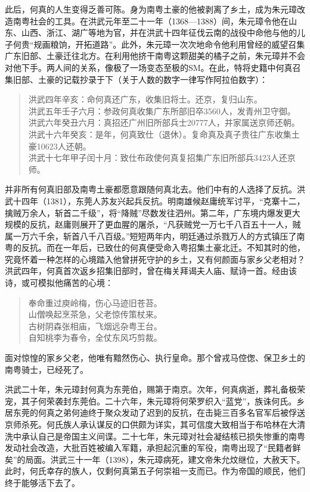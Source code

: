 此后，何真的人生变得乏善可陈。身为南粤土豪的他被剥离了乡土，成为朱元璋改造南粤社会的工具。在洪武元年至二十一年（1368—1388）间，朱元璋令他在山东、山西、浙江、湖广等地为官，并在洪武十四年征伐云南的战役中命他与他的儿子何贵“规画粮饷，开拓道路”。此外，朱元璋一次次地命令他利用曾经的威望召集广东旧部、土豪迁往北方。在利用他挤干南粤这颗甜美的橘子之前，朱元璋并不会对他下手。两人间的关系，像极了一场变态至极的SM。在此，特将史籍中何真召集旧部、土豪的记载抄录于下（关于人数的数字一律写作阿拉伯数字）：

\begin{quote}
洪武四年辛亥：命何真还广东，收集旧将士。还京，复归山东。\\
洪武五年壬子六月：参政何真收集广东所部旧卒3560人，发青州卫守御。\\
洪武六年癸丑六月：真招还广州旧所部兵士20777人，并家属送京师还朝。\\
洪武十六年癸亥：是年，何真致仕（退休）。复命真及真子贵往广东收集土豪10623人还朝。\\
洪武十七年甲子闰十月：致仕布政使何真复招集广东旧所部兵3423人还京师。
\end{quote}

并非所有何真旧部及南粤土豪都愿意跟随何真北去。他们中有的人选择了反抗。洪武十四年（1381），东莞人苏友兴起兵反抗。明南雄候赵庸统军讨平，“克寨十二，擒贼万余人，斩首二千级”，将“降贼”尽数发往泗州。第二年，广东境内爆发更大规模的反抗，赵庸则展开了更血腥的屠杀，“凡获贼党一万七千八百五十一人，贼属一万六千余，斩首八千八百级。”短短两年内，明廷通过杀戮万人的方式镇压了南粤的反抗。而在一年后，已致仕的何真便受命入粤招集土豪北迁。不知其时的他，究竟怀着一种怎样的心境踏入他曾拼死守护的乡土，又有何颜面与家乡父老相对？洪武四年，何真首次返乡招集旧部时，曾在梅关拜谒夫人庙、赋诗一首。经由该诗，或可模拟他痛苦的心境：

\begin{quote}
奉命重过庾岭梅，伤心马迹旧苍苔。\\
山僧唤起烹茶急，父老惊传策杖来。\\
古树阴森张相庙，飞烟远杂粤王台。\\
自知桃李为春令，全仗东风巧剪裁。
\end{quote}

面对惊惶的家乡父老，他唯有黯然伤心、执行皇命。那个曾戎马倥偬、保卫乡土的南粤骑士，已经死了。

洪武二十年，朱元璋封何真为东莞伯，赐第于南京。次年，何真病逝，葬礼备极荣宠，其子何荣袭封东莞伯。二十六年，朱元璋将何荣罗织入“蓝党”，族诛何氏。乡居东莞的何真之弟何迪终于聚众发动了迟到的反抗，在击毙三百多名官军后被俘送京师杀死。何氏族人承认谋反的口供颇为详实，其可信度大致相当于布哈林在大清洗中承认自己是帝国主义间谍。二十七年，朱元璋对社会凝结核已损失惨重的南粤发动社会改造，大批百姓被编入军籍，承担起沉重的军役，南粤出现了“民籍者鲜矣”的局面。洪武三十一年（1398），朱元璋病死，建文帝朱允炆继位，大赦天下。此时，何氏幸存的族人，仅剩何真第五子何崇祖一支而已。作为帝国的顺民，他们终于能够活下去了。

